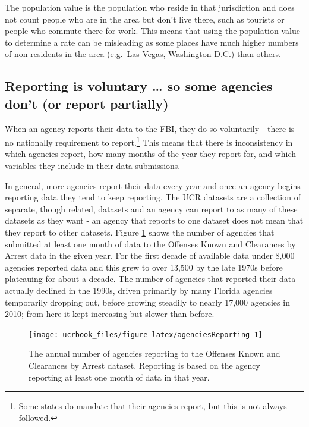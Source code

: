 \documentclass[
  12pt,
  openany]{book}
\begin{document}
The population value is the population who reside in that jurisdiction and does not count people who are in the area but don't live there, such as tourists or people who commute there for work. This means that using the population value to determine a rate can be misleading as some places have much higher numbers of non-residents in the area (e.g.~Las Vegas, Washington D.C.) than others.

\hypertarget{voluntary}{%
\subsection{Reporting is voluntary \ldots{} so some agencies don't (or report partially)}\label{voluntary}}

When an agency reports their data to the FBI, they do so voluntarily - there is no nationally requirement to report.\footnote{Some states do mandate that their agencies report, but this is not always followed.} This means that there is inconsistency in which agencies report, how many months of the year they report for, and which variables they include in their data submissions.

In general, more agencies report their data every year and once an agency begins reporting data they tend to keep reporting. The UCR datasets are a collection of separate, though related, datasets and an agency can report to as many of these datasets as they want - an agency that reports to one dataset does not mean that they report to other datasets. Figure \ref{fig:agenciesReporting} shows the number of agencies that submitted at least one month of data to the Offenses Known and Clearances by Arrest data in the given year. For the first decade of available data under 8,000 agencies reported data and this grew to over 13,500 by the late 1970s before plateauing for about a decade. The number of agencies that reported their data actually declined in the 1990s, driven primarily by many Florida agencies temporarily dropping out, before growing steadily to nearly 17,000 agencies in 2010; from here it kept increasing but slower than before.

\begin{figure}

{\centering \texttt{[image: ucrbook\_files/figure-latex/agenciesReporting-1]} 

}

\caption{The annual number of agencies reporting to the Offenses Known and Clearances by Arrest dataset. Reporting is based on the agency reporting at least one month of data in that year.}\label{fig:agenciesReporting}
\end{figure}
\end{document}
